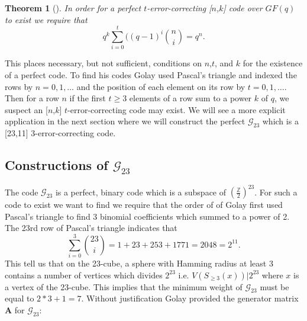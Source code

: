 \documentclass[paper=a4, fontsize=11pt]{scrartcl} %
\numberwithin{equation}{section} %
\numberwithin{figure}{section} %
\numberwithin{table}{section} %
\newtheorem{thm}{Theorem}
\begin{document}
\begin{thm}[\cite{pless}]
In order for a perfect $t$-error-correcting [$n$,$k$] code over $GF(q)$ to exist we require that
$$
q^k \sum_{i=0}^t ((q-1)^i{n \choose i} = q^n. 
$$
\end{thm}

This places necessary, but not sufficient, conditions on $n$,$t$, and $k$ for the existence of a perfect code. To find his codes Golay used Pascal's triangle and indexed the rows by $n = 0, 1, \ldots$ and the position of each element on its row by $t = 0,1, \ldots$. Then for a row $n$ if the first $t \geq 3$ elements of a row sum to a power $k$ of $q$, we suspect an [$n$,$k$] $t$-error-correcting code may exist. We will see a more explicit application in the next section where we will construct the perfect $\mathcal{G}_{23}$ which is a [23,11] 3-error-correcting code. 



\subsection{Constructions of $\mathcal{G}_{23}$}
The code $\mathcal{G}_{23}$ is a perfect, binary code which is a subspace of $(\frac{\mathbb{Z}}{2})^23$. For such a code to exist we want to find we require that the order of of 
Golay first used Pascal's triangle to find 3 binomial coefficients which summed to a power of 2. The 23rd row of Pascal's triangle indicates that
$$\sum_{i=0}^3 {23 \choose i} = 1+23+253+1771 = 2048 = 2^{11}.$$ This tell us that on the 23-cube, a sphere with Hamming radius at least 3 contains a number of vertices which divides $2^{23}$ i.e. $V(S_{\geq 3}(x) )|2^{23}$ where $x$ is a vertex of the 23-cube. This implies that the minimum weight of $\mathcal{G}_{23}$ must be equal to $2*3+1=7$. Without justification Golay provided the generator matrix $\mathbf{A}$ for $\mathcal{G}_{23}$:
\end{document}

